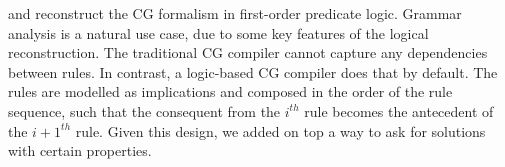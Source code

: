 \cite{lager98} and \cite{lager_nivre01} reconstruct the CG formalism in first-order predicate logic.
Grammar analysis is a natural use case, due to some key features of the logical reconstruction.
The traditional CG compiler 
 cannot capture any dependencies between rules.
In contrast, a logic-based CG compiler does that by default. 
The rules are modelled as implications and composed in the order of the rule sequence, such that 
the consequent from the $i^{th}$ rule becomes the antecedent of the $i+1^{th}$ rule.
Given this design, we added on top a way to ask for solutions with certain properties.














